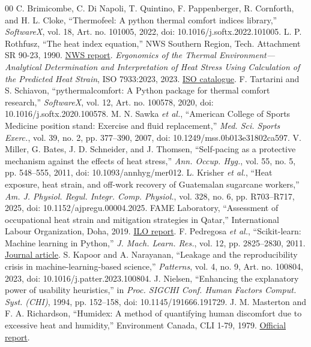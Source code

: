 \documentclass[conference,a4paper]{IEEEtran}
\begin{document}
\begin{thebibliography}{00}
 C. Brimicombe, C. Di Napoli, T. Quintino, F. Pappenberger, R. Cornforth, and H. L. Cloke, ``Thermofeel: A python thermal comfort indices library,'' \emph{SoftwareX}, vol. 18, Art. no. 101005, 2022, doi: 10.1016/j.softx.2022.101005.
 L. P. Rothfusz, ``The heat index equation,'' NWS Southern Region, Tech. Attachment SR 90-23, 1990. \href{https://www.weather.gov/media/ffc/ta_htindx.PDF}{NWS report}.
 \emph{Ergonomics of the Thermal Environment---Analytical Determination and Interpretation of Heat Stress Using Calculation of the Predicted Heat Strain}, ISO 7933:2023, 2023. \href{https://www.iso.org/standard/78240.html}{ISO catalogue}.
 F. Tartarini and S. Schiavon, ``pythermalcomfort: A Python package for thermal comfort research,'' \emph{SoftwareX}, vol. 12, Art. no. 100578, 2020, doi: 10.1016/j.softx.2020.100578.
 M. N. Sawka \emph{et al.}, ``American College of Sports Medicine position stand: Exercise and fluid replacement,'' \emph{Med. Sci. Sports Exerc.}, vol. 39, no. 2, pp. 377--390, 2007, doi: 10.1249/mss.0b013e31802ca597.
 V. Miller, G. Bates, J. D. Schneider, and J. Thomsen, ``Self-pacing as a protective mechanism against the effects of heat stress,'' \emph{Ann. Occup. Hyg.}, vol. 55, no. 5, pp. 548--555, 2011, doi: 10.1093/annhyg/mer012.
 L. Krisher \emph{et al.}, ``Heat exposure, heat strain, and off-work recovery of Guatemalan sugarcane workers,'' \emph{Am. J. Physiol. Regul. Integr. Comp. Physiol.}, vol. 328, no. 6, pp. R703--R717, 2025, doi: 10.1152/ajpregu.00004.2025.
 FAME Laboratory, ``Assessment of occupational heat strain and mitigation strategies in Qatar,'' International Labour Organization, Doha, 2019. \href{https://www.ilo.org/publications/assessment-occupational-heat-strain-and-mitigation-strategies-qatar}{ILO report}.
 F. Pedregosa \emph{et al.}, ``Scikit-learn: Machine learning in Python,'' \emph{J. Mach. Learn. Res.}, vol. 12, pp. 2825--2830, 2011. \href{https://jmlr.org/papers/v12/pedregosa11a.html}{Journal article}.
 S. Kapoor and A. Narayanan, ``Leakage and the reproducibility crisis in machine-learning-based science,'' \emph{Patterns}, vol. 4, no. 9, Art. no. 100804, 2023, doi: 10.1016/j.patter.2023.100804.
 J. Nielsen, ``Enhancing the explanatory power of usability heuristics,'' in \emph{Proc. SIGCHI Conf. Human Factors Comput. Syst. (CHI)}, 1994, pp. 152--158, doi: 10.1145/191666.191729.
 J. M. Masterton and F. A. Richardson, ``Humidex: A method of quantifying human discomfort due to excessive heat and humidity,'' Environment Canada, CLI 1-79, 1979. \href{https://publications.gc.ca/collections/collection_2018/eccc/En57-23-1-79-eng.pdf}{Official report}.

\end{thebibliography}
\end{document}
